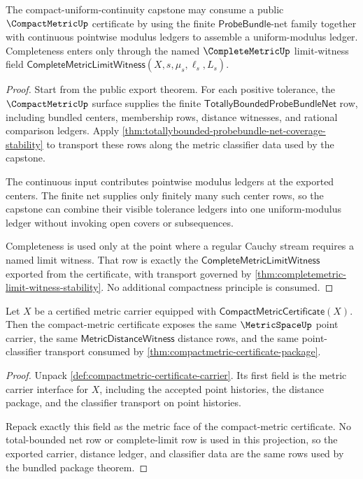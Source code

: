 \begin{theorem}
\label{thm:compactmetric-heine-cantor-input-boundary}
The compact-uniform-continuity capstone may consume a public
$\CompactMetricUp$ certificate by using the finite
$\mathsf{ProbeBundle}$-net family together with continuous pointwise modulus
ledgers to assemble a uniform-modulus ledger. Completeness enters only through
the named $\CompleteMetricUp$ limit-witness field
$\mathsf{CompleteMetricLimitWitness}(X,s,\mu_s,\ell_s,L_s)$.
\end{theorem}
\begin{proof}
Start from the public export theorem. For each positive tolerance, the
$\CompactMetricUp$ surface supplies the finite
$\mathsf{TotallyBoundedProbeBundleNet}$ row, including bundled centers,
membership rows, distance witnesses, and rational comparison ledgers. Apply
\autoref{thm:totallybounded-probebundle-net-coverage-stability} to transport
these rows along the metric classifier data used by the capstone.

The continuous input contributes pointwise modulus ledgers at the exported
centers. The finite net supplies only finitely many such center rows, so the
capstone can combine their visible tolerance ledgers into one
uniform-modulus ledger without invoking open covers or subsequences.

Completeness is used only at the point where a regular Cauchy stream requires
a named limit witness. That row is exactly the
$\mathsf{CompleteMetricLimitWitness}$ exported from the certificate, with
transport governed by
\autoref{thm:completemetric-limit-witness-stability}. No additional
compactness principle is consumed.
\end{proof}

\begin{theorem}
\label{thm:compactmetric-metric-field-projection}
Let $X$ be a certified metric carrier equipped with
$\mathsf{CompactMetricCertificate}(X)$. Then the compact-metric certificate
exposes the same $\MetricSpaceUp$ point carrier, the same
$\mathsf{MetricDistanceWitness}$ distance rows, and the same point-classifier
transport consumed by \autoref{thm:compactmetric-certificate-package}.
\end{theorem}
\begin{proof}
Unpack \autoref{def:compactmetric-certificate-carrier}. Its first field is the
metric carrier interface for $X$, including the accepted point histories, the
distance package, and the classifier transport on point histories.

Repack exactly this field as the metric face of the compact-metric certificate.
No total-bounded net row or complete-limit row is used in this projection, so
the exported carrier, distance ledger, and classifier data are the same rows
used by the bundled package theorem.
\end{proof}

